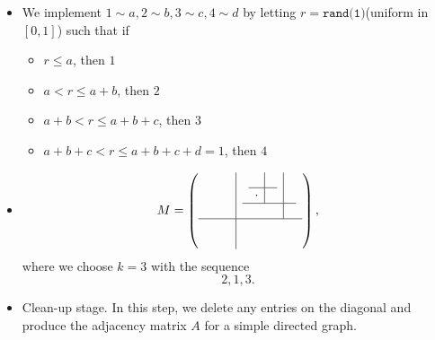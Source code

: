 \begin{remark}
	\begin{itemize}
		\item We implement \(1\sim a, 2\sim b, 3\sim c, 4\sim d\) by letting \(r = \texttt{rand(1)}\)(uniform in \([0, 1]\)) such that if
		      \begin{itemize}
			      \item \(r\leq a\), then \(1\)
			      \item \(a< r\leq a+b\), then \(2\)
			      \item \(a+b<r\leq a+b+c\), then \(3\)
			      \item \(a+b+c < r\leq a+b+c+d = 1\), then \(4\)
		      \end{itemize}
		\item \begin{eg}
			      \[
				      M = \left(
				      \begin{array}{c|c}
						      \begin{array}{cc}
							       & \\
							       &
						      \end{array} & \begin{array}{c|c}
							                    \begin{array}{c|c}
								            & \\
								      \hline
								      \cdot &
							      \end{array} &    \\
							                    \hline
							                                       &
						                    \end{array} \\
						      \hline
						      \begin{array}{cc}
							       & \\
							       &
						      \end{array} & \begin{array}{cc}
							                     & \\
							                     &
						                    \end{array}
					      \end{array}
				      \right),
			      \]
			      where we choose \(k = 3\) with the sequence
			      \[
				      2, 1, 3.
			      \]
		      \end{eg}
		\item Clean-up stage. In this step, we delete any entries on the diagonal and produce the adjacency matrix \(A\) for a simple directed graph.

\end{itemize}
\end{remark}
